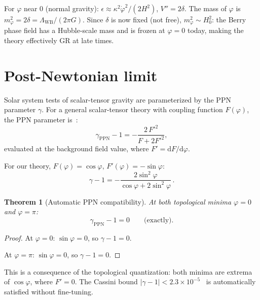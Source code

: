 \documentclass[aps,prd,twocolumn,superscriptaddress,nofootinbib]{revtex4-2}
\newcommand{\dd}{\mathrm{d}}
\newcommand{\Lw}{\Lambda_{\mathrm{WB}}}
\newtheorem{theorem}{Theorem}
\begin{document}
For $\varphi$ near $0$ (normal gravity):
$\epsilon \approx \kappa^2\dot\varphi^2/(2H^2)$,
$V'' = 2\delta$.
The mass of $\varphi$ is $m_\varphi^2 = 2\delta = \Lw/(2\pi G)$.
Since $\delta$ is now fixed (not free),
$m_\varphi^2 \sim H_0^2$: the Berry phase field has a
Hubble-scale mass and is frozen at $\varphi = 0$ today,
making the theory effectively GR at late times.


\section{Post-Newtonian limit}
\label{sec:PPN}

Solar system tests of scalar-tensor gravity are parameterized
by the PPN parameter $\gamma$.
For a general scalar-tensor theory with coupling function $F(\varphi)$,
the PPN parameter is~\cite{Will2014}:
\begin{equation}
  \gamma_{\mathrm{PPN}} - 1
  = -\frac{2\,F'^2}{F + 2F'^2},
  \label{eq:gamma_PPN}
\end{equation}
evaluated at the background field value,
where $F' = \dd F/\dd\varphi$.

For our theory, $F(\varphi) = \cos\varphi$,
$F'(\varphi) = -\sin\varphi$:
\begin{equation}
  \gamma - 1 = -\frac{2\sin^2\varphi}{\cos\varphi + 2\sin^2\varphi}\,.
\end{equation}

\begin{theorem}[Automatic PPN compatibility]
At both topological minima $\varphi = 0$ and $\varphi = \pi$:
\begin{equation}
  \gamma_{\mathrm{PPN}} - 1 = 0 \qquad \text{(exactly)}.
\end{equation}
\end{theorem}

\begin{proof}
At $\varphi = 0$: $\sin\varphi = 0$, so
$\gamma - 1 = 0$.

At $\varphi = \pi$: $\sin\varphi = 0$, so
$\gamma - 1 = 0$.
\end{proof}

This is a consequence of the topological quantization:
both minima are extrema of $\cos\varphi$, where $F' = 0$.
The Cassini bound $|\gamma - 1| < 2.3 \times 10^{-5}$~\cite{Bertotti2003}
is automatically satisfied without fine-tuning.
\end{document}

